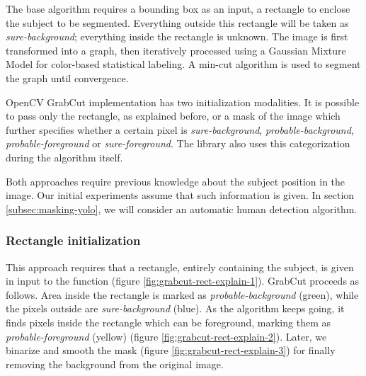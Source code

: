 The base algorithm \cite{opencv_grabcut} requires a bounding box as an input, a rectangle to enclose the subject to be segmented. Everything outside this rectangle will be taken as \textit{sure-background}; everything inside the rectangle is unknown. The image is first transformed into a graph, then iteratively processed using a Gaussian Mixture Model \cite{Reynolds2009} for color-based statistical labeling. A min-cut algorithm is used to segment the graph until convergence.

OpenCV GrabCut implementation has two initialization modalities. It is possible to pass only the rectangle, as explained before, or a mask of the image which further specifies whether a certain pixel is \textit{sure-background}, \textit{probable-background}, \textit{probable-foreground} or \textit{sure-foreground}. The library also uses this categorization during the algorithm itself. 

\medskip

Both approaches require previous knowledge about the subject position in the image. Our initial experiments assume that such information is given. In section \ref{subsec:masking-yolo}, we will consider an automatic human detection algorithm.


\subsubsection{Rectangle initialization}
\label{subsec:masking-grabcut-rect}

This approach requires that a rectangle, entirely containing the subject, is given in input to the function (figure \ref{fig:grabcut-rect-explain-1}). GrabCut proceeds as follows. Area inside the rectangle is marked as \textit{probable-background} (green), while the pixels outside are \textit{sure-background} (blue). As the algorithm keeps going, it finds pixels inside the rectangle which can be foreground, marking them as \textit{probable-foreground} (yellow) (figure \ref{fig:grabcut-rect-explain-2}). Later, we binarize and smooth the mask (figure \ref{fig:grabcut-rect-explain-3}) for finally removing the background from the original image.

